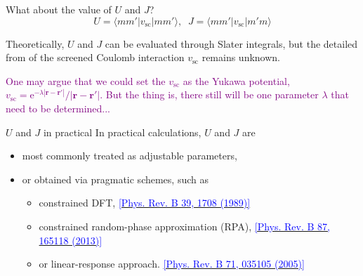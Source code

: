\documentclass{beamer}
\newcommand{\purple}{\textcolor{purple}}
\begin{document}
  \begin{frame}{What about the value of \(U\) and \(J\)?}
    \begin{equation*}
        U = \langle{}mm'|v_{\text{sc}}|mm'\rangle, \;\; J = \langle{}mm'|v_{\text{sc}}|m'm\rangle
    \end{equation*}

    Theoretically, \(U\) and \(J\) can be evaluated through Slater integrals, but the detailed from of the screened Coulomb interaction \(v_{\text{sc}}\) remains unknown. 
    
    \purple{One may argue that we could set the \(v_{\text{sc}}\) as the Yukawa potential, \(v_{\text{sc}} = \mathrm{e}^{-\lambda{}|\bm{r}-\bm{r'}|}/|\bm{r}-\bm{r'}|\). But the thing is, there still will be one parameter \(\lambda\) that need to be determined...}
    
    
    \begin{block}{\(U\) and \(J\) in practical}
      In practical calculations, \(U\) and \(J\) are 
      \begin{itemize}
        \item most commonly treated as adjustable parameters,
        \item or obtained via pragmatic schemes, such as
        \begin{itemize}
          \item constrained DFT, \href{https://doi.org/10.1103/physrevb.39.1708}{\textcolor{blue}{\tiny[Phys. Rev. B 39, 1708 (1989)]}}
          \item constrained random-phase approximation (RPA), \href{https://doi.org/10.1103/PhysRevB.87.165118}{\textcolor{blue}{\tiny[Phys. Rev. B 87, 165118 (2013)]}}
          \item or linear-response approach. \href{https://doi.org/10.1103/PhysRevB.71.035105}{\textcolor{blue}{\tiny[Phys. Rev. B 71, 035105 (2005)]}}
        \end{itemize}
      \end{itemize}
    \end{block}
  \end{frame}
\end{document}
